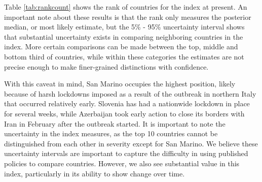 \documentclass[]{article}
\begin{document}
Table \ref{tab:rankcount} shows the rank of countries for the index at present. An important note about these results is that the rank only measures the posterior median, or most likely estimate, but the 5\% - 95\% uncertainty interval shows that substantial uncertainty exists in comparing neighboring countries in the index. More certain comparisons can be made between the top, middle and bottom third of countries, while within these categories the estimates are not precise enough to make finer-grained distinctions with confidence.

With this caveat in mind, San Marino occupies the highest position, likely because of harsh lockdowns imposed as a result of the outbreak in northern Italy that occurred relatively early. Slovenia has had a nationwide lockdown in place for several weeks, while Azerbaijan took early action to close its borders with Iran in February after the outbreak started. It is important to note the uncertainty in the index measures, as the top 10 countries cannot be distinguished from each other in severity except for San Marino. We believe these uncertainty intervals are important to capture the difficulty in using published policies to compare countries. However, we also see substantial value in this index, particularly in its ability to show change over time.
\end{document}
